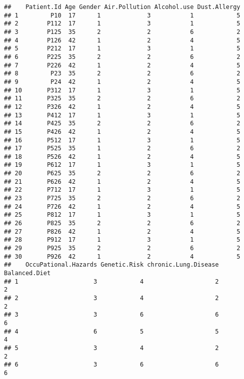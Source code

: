 \documentclass[]{article}
\begin{document}
\begin{verbatim}
##    Patient.Id Age Gender Air.Pollution Alcohol.use Dust.Allergy
## 1         P10  17      1             3           1            5
## 2        P112  17      1             3           1            5
## 3        P125  35      2             2           6            2
## 4        P126  42      1             2           4            5
## 5        P212  17      1             3           1            5
## 6        P225  35      2             2           6            2
## 7        P226  42      1             2           4            5
## 8         P23  35      2             2           6            2
## 9         P24  42      1             2           4            5
## 10       P312  17      1             3           1            5
## 11       P325  35      2             2           6            2
## 12       P326  42      1             2           4            5
## 13       P412  17      1             3           1            5
## 14       P425  35      2             2           6            2
## 15       P426  42      1             2           4            5
## 16       P512  17      1             3           1            5
## 17       P525  35      1             2           6            2
## 18       P526  42      1             2           4            5
## 19       P612  17      1             3           1            5
## 20       P625  35      2             2           6            2
## 21       P626  42      1             2           4            5
## 22       P712  17      1             3           1            5
## 23       P725  35      2             2           6            2
## 24       P726  42      1             2           4            5
## 25       P812  17      1             3           1            5
## 26       P825  35      2             2           6            2
## 27       P826  42      1             2           4            5
## 28       P912  17      1             3           1            5
## 29       P925  35      2             2           6            2
## 30       P926  42      1             2           4            5
##    OccuPational.Hazards Genetic.Risk chronic.Lung.Disease Balanced.Diet
## 1                     3            4                    2             2
## 2                     3            4                    2             2
## 3                     3            6                    6             6
## 4                     6            5                    5             4
## 5                     3            4                    2             2
## 6                     3            6                    6             6

\end{verbatim}
\end{document}
